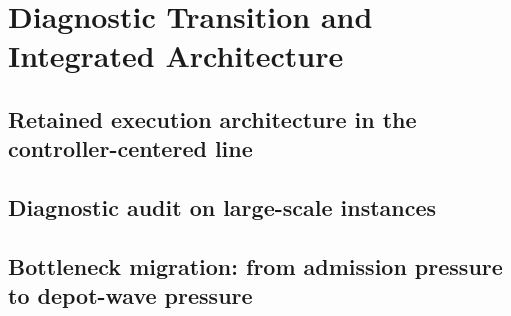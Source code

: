 \chapter{Diagnostic Transition and Integrated Architecture}
\label{chap:architecture_retained_method}


\section{Retained execution architecture in the controller-centered line}
%

\section{Diagnostic audit on large-scale instances}
%
%

\section{Bottleneck migration: from admission pressure to depot-wave pressure}
%

